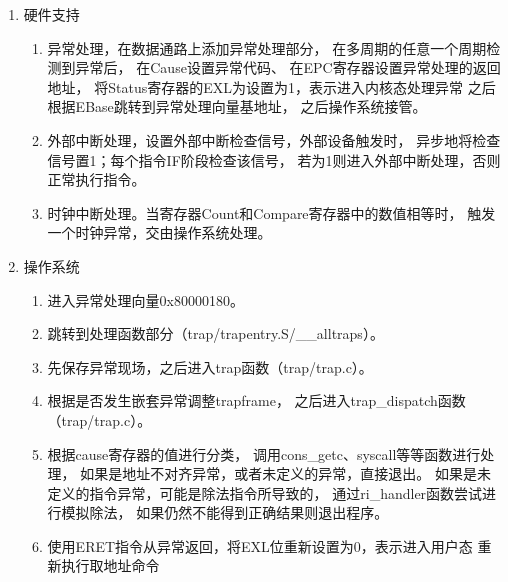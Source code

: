             \begin{enumerate}
            \item
            硬件支持
                \begin{enumerate}
                \item
                异常处理，在数据通路上添加异常处理部分，%
                在多周期的任意一个周期检测到异常后，%
                在Cause设置异常代码、%
                在EPC寄存器设置异常处理的返回地址，%
                将Status寄存器的EXL为设置为1，表示进入内核态处理异常%
                之后根据EBase跳转到异常处理向量基地址，%
                之后操作系统接管。
                \item
                外部中断处理，设置外部中断检查信号，外部设备触发时，%
                异步地将检查信号置1；每个指令IF阶段检查该信号，%
                若为1则进入外部中断处理，否则正常执行指令。
                \item
                时钟中断处理。当寄存器Count和Compare寄存器中的数值相等时，%
                触发一个时钟异常，交由操作系统处理。
                \end{enumerate}
            \item
            操作系统
                \begin{enumerate}
                \item
                进入异常处理向量0x80000180。
                \item
                跳转到处理函数部分（trap/trapentry.S/\_\_alltraps）。
                \item
                先保存异常现场，之后进入trap函数（trap/trap.c）。
                \item
                根据是否发生嵌套异常调整trapframe，%
                之后进入trap\_dispatch函数（trap/trap.c）。
                \item
                根据cause寄存器的值进行分类，%
                调用cons\_getc、syscall等等函数进行处理，%
                如果是地址不对齐异常，或者未定义的异常，直接退出。%
                如果是未定义的指令异常，可能是除法指令所导致的，%
                通过ri\_handler函数尝试进行模拟除法，%
                如果仍然不能得到正确结果则退出程序。
                \item
                使用ERET指令从异常返回，将EXL位重新设置为0，表示进入用户态
                重新执行取地址命令
                \end{enumerate}
            \end{enumerate}

